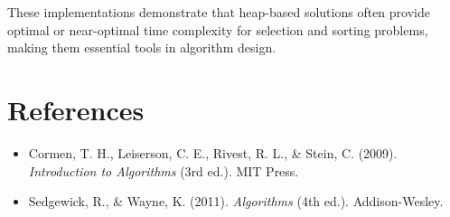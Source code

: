 \documentclass[12pt]{article}
\begin{document}
These implementations demonstrate that heap-based solutions often provide optimal or near-optimal time complexity for selection and sorting problems, making them essential tools in algorithm design.

\section{References}
\begin{itemize}
    \item Cormen, T. H., Leiserson, C. E., Rivest, R. L., \& Stein, C. (2009). \textit{Introduction to Algorithms} (3rd ed.). MIT Press.
    \item Sedgewick, R., \& Wayne, K. (2011). \textit{Algorithms} (4th ed.). Addison-Wesley.
\end{itemize}


\end{document}
